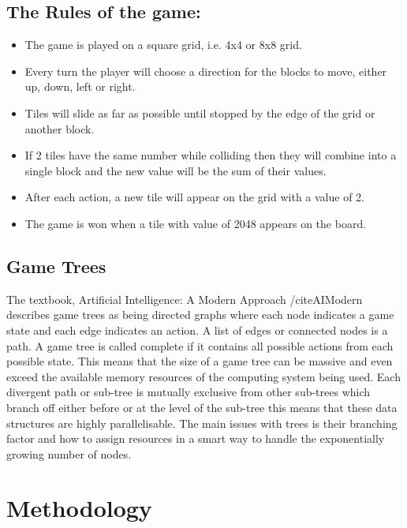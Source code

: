 \documentclass[11pt]{article}
\begin{document}
\begin{page}
\subsection{The Rules of the game:}
	\begin{itemize}
		\item The game is played on a square grid, i.e. 4x4 or 8x8 grid.
		\item Every turn the player will choose a direction for the blocks to move, either up, down, left or right.
		\item Tiles will slide as far as possible until stopped by the edge of the grid or another block. 
		\item If 2 tiles have the same number while colliding then they will combine into a single block and the new value will be the sum of their values.
		\item After each action, a new tile will appear on the grid with a value of 2.
		\item The game is won when a tile with value of 2048 appears on the board. 
	\end{itemize}

\subsection{Game Trees}
The textbook, Artificial Intelligence: A Modern Approach /cite{AIModern} describes game trees as being directed graphs where each node indicates a game state and each edge indicates an action. A list of edges or connected nodes is a path. A game tree is called complete if it contains all possible actions from each possible state. This means that the size of a game tree can be massive and even exceed the available memory resources of the computing system being used. Each divergent path or sub-tree is mutually exclusive from other sub-trees which branch off either before or at the level of the sub-tree this means that these data structures are highly parallelisable. The main issues with trees is their branching factor and how to assign resources in a smart way to handle the exponentially growing number of nodes.

\section{Methodology}

\end{page}
\end{document}
